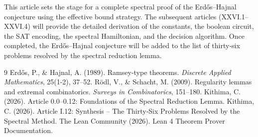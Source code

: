 \documentclass[11pt,a4paper]{article}
\begin{document}
This article sets the stage for a complete spectral proof of the Erdős–Hajnal conjecture using the effective bound strategy. The subsequent articles (XXVI.1–XXVI.4) will provide the detailed derivation of the constants, the boolean circuit, the SAT encoding, the spectral Hamiltonian, and the decision algorithm. Once completed, the Erdős–Hajnal conjecture will be added to the list of thirty‑six problems resolved by the spectral reduction lemma.


\begin{thebibliography}{9}
  Erdős, P., \& Hajnal, A. (1989). Ramsey-type theorems. \emph{Discrete Applied Mathematics}, 25(1-2), 37–52.
  Rödl, V., \& Schacht, M. (2009). Regularity lemmas and extremal combinatorics. \emph{Surveys in Combinatorics}, 151–180.
  Kithima, C. (2026). Article 0.0–0.12: Foundations of the Spectral Reduction Lemma.
  Kithima, C. (2026). Article I.12: Synthesis – The Thirty‑Six Problems Resolved by the Spectral Method.
  The Lean Community (2026). Lean 4 Theorem Prover Documentation.
\end{thebibliography}
\end{document}
